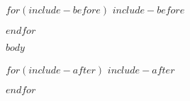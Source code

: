 \documentclass[
  parskip=full,
$if(fontsize)$
  $fontsize$,
$else$
  12pt,
$endif$
$if(papersize)$
  $papersize$paper,
$else$
  letterpaper,
$endif$
$for(classoption)$
  $classoption$$sep$,
$endfor$
]{scrartcl}
\begin{document}
$for(include-before)$
$include-before$

$endfor$
\centering

$body$

$for(include-after)$
$include-after$

$endfor$
\end{document}
